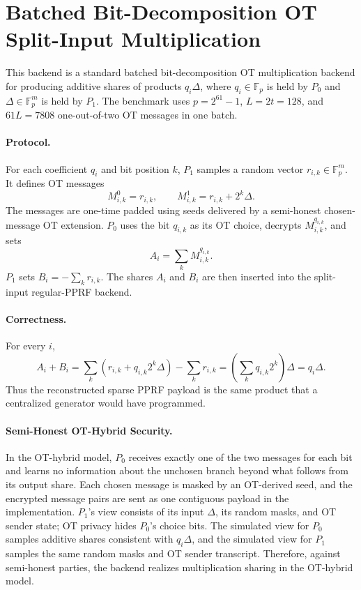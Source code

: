 \section{Batched Bit-Decomposition OT Split-Input Multiplication}

This backend is a standard batched bit-decomposition OT multiplication backend for producing additive shares of products \(q_i \Delta\), where \(q_i \in \mathbb{F}_p\) is held by \(P_0\) and \(\Delta \in \mathbb{F}_p^m\) is held by \(P_1\). The benchmark uses \(p=2^{61}-1\), \(L=2t=128\), and \(61L=7808\) one-out-of-two OT messages in one batch.

\paragraph{Protocol.}
For each coefficient \(q_i\) and bit position \(k\), \(P_1\) samples a random vector \(r_{i,k}\in\mathbb{F}_p^m\). It defines OT messages
\[
M^0_{i,k}=r_{i,k},\qquad M^1_{i,k}=r_{i,k}+2^k\Delta.
\]
The messages are one-time padded using seeds delivered by a semi-honest chosen-message OT extension. \(P_0\) uses the bit \(q_{i,k}\) as its OT choice, decrypts \(M^{q_{i,k}}_{i,k}\), and sets
\[
A_i=\sum_k M^{q_{i,k}}_{i,k}.
\]
\(P_1\) sets \(B_i=-\sum_k r_{i,k}\). The shares \(A_i\) and \(B_i\) are then inserted into the split-input regular-PPRF backend.

\paragraph{Correctness.}
For every \(i\),
\[
A_i+B_i
=\sum_k \left(r_{i,k}+q_{i,k}2^k\Delta\right)-\sum_k r_{i,k}
=\left(\sum_k q_{i,k}2^k\right)\Delta
=q_i\Delta.
\]
Thus the reconstructed sparse PPRF payload is the same product that a centralized generator would have programmed.

\paragraph{Semi-Honest OT-Hybrid Security.}
In the OT-hybrid model, \(P_0\) receives exactly one of the two messages for each bit and learns no information about the unchosen branch beyond what follows from its output share. Each chosen message is masked by an OT-derived seed, and the encrypted message pairs are sent as one contiguous payload in the implementation. \(P_1\)'s view consists of its input \(\Delta\), its random masks, and OT sender state; OT privacy hides \(P_0\)'s choice bits. The simulated view for \(P_0\) samples additive shares consistent with \(q_i\Delta\), and the simulated view for \(P_1\) samples the same random masks and OT sender transcript. Therefore, against semi-honest parties, the backend realizes multiplication sharing in the OT-hybrid model.


